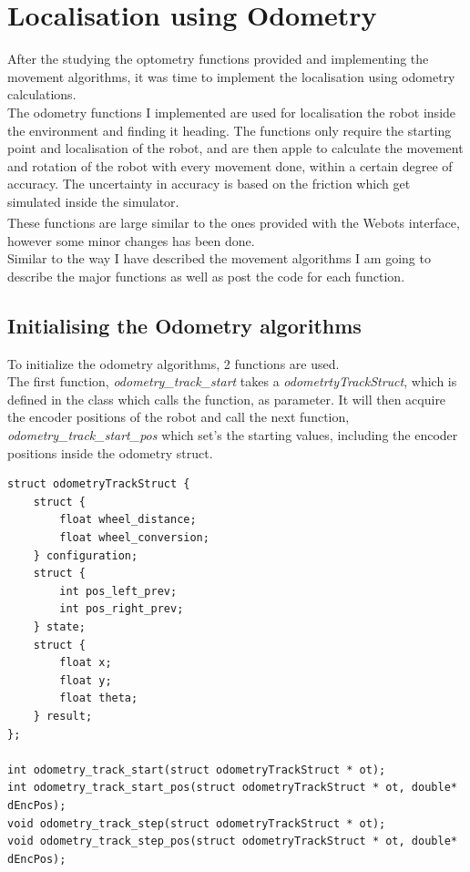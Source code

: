 \section{Localisation using Odometry}
After the studying the optometry functions provided and implementing the movement algorithms, it was time to implement the localisation using odometry calculations.\\
The odometry functions I implemented are used for localisation the robot inside the environment and finding it heading. The functions only require the starting point and localisation of the robot, and are then apple to calculate the movement and rotation of the robot with every movement done, within a certain degree of accuracy. The uncertainty in accuracy is based on the friction which get simulated inside the simulator. \\
These functions are large similar to the ones provided with the Webots\textsuperscript{\texttrademark} interface, however some minor changes has been done. \\
Similar to the way I have described the movement algorithms I am going to describe the major functions as well as post the code for each function.\\

\subsection{Initialising the Odometry algorithms}
To initialize the odometry algorithms, 2 functions are used. \\
The first function, \textit{odometry\_track\_start} takes a \textit{odometrtyTrackStruct}, which is defined in the class which calls the function, as parameter. It will then acquire the encoder positions of the robot and call the next function, \textit{odometry\_track\_start\_pos} which set's the starting values, including the encoder positions inside the odometry struct.\\
\begin{lstlisting}
struct odometryTrackStruct {
	struct {
		float wheel_distance;
		float wheel_conversion;
	} configuration;
	struct {
		int pos_left_prev;
		int pos_right_prev;
	} state;
	struct {
		float x;
		float y;
		float theta;
	} result;
};
 
int odometry_track_start(struct odometryTrackStruct * ot);
int odometry_track_start_pos(struct odometryTrackStruct * ot, double* dEncPos);
void odometry_track_step(struct odometryTrackStruct * ot);
void odometry_track_step_pos(struct odometryTrackStruct * ot, double* dEncPos);
\end{lstlisting}

